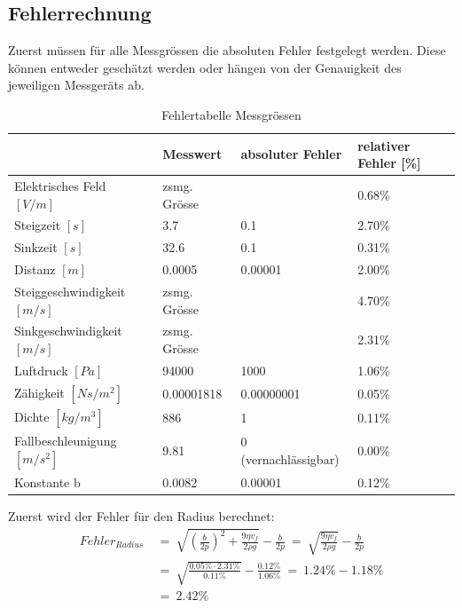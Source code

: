 \subsection{Fehlerrechnung}\label{sub:fehler}
Zuerst müssen für alle Messgrössen die absoluten Fehler festgelegt werden. Diese können entweder geschätzt werden oder hängen von der Genauigkeit des jeweiligen Messgeräts ab.

\begin{table}[h]
	\begin{center}
		\begin{tabular}{l|lll}
			                             & Messwert     & absoluter Fehler     & relativer Fehler [\%] \\ \toprule
			Elektrisches Feld $[V/m]$    & zsmg. Grösse &                      & 0.68\%                \\
			Steigzeit $[s]$              & 3.7          & 0.1                  & 2.70\%                \\
			Sinkzeit $[s]$               & 32.6         & 0.1                  & 0.31\%                \\
			Distanz $[m]$                & 0.0005       & 0.00001              & 2.00\%                \\
			Steiggeschwindigkeit $[m/s]$ & zsmg. Grösse &                      & 4.70\%                \\
			Sinkgeschwindigkeit $[m/s]$  & zsmg. Grösse &                      & 2.31\%                \\
			Luftdruck $[Pa]$             & 94000        & 1000                 & 1.06\%                \\
			Zähigkeit $[Ns/m^2]$         & 0.00001818   & 0.00000001           & 0.05\%                \\
			Dichte $[kg/m^3]$            & 886          & 1                    & 0.11\%                \\
			Fallbeschleunigung $[m/s^2]$ & 9.81         & 0 (vernachlässigbar) & 0.00\%                \\
			Konstante b                  & 0.0082       & 0.00001              & 0.12\%
		\end{tabular}
	\end{center}
	\caption{Fehlertabelle Messgrössen}
	\label{tab:messabsFehler}
\end{table}

\noindent Zuerst wird der Fehler für den Radius berechnet:
\begin{equation*}\label{eq:fehlerRadius}
	\begin{split}
		Fehler_{Radius} & \ = \ \sqrt{\left( \frac{b}{2p}\right)^2 + \frac{9\eta v_f}{2\rho g}} - \frac{b}{2p} \ = \ \sqrt{\frac{9\eta v_f}{2\rho g}} - \frac{b}{2p} \\
		                & \ = \ \sqrt{\frac{0.05\% \cdot 2.31\%}{0.11\%}} - \frac{0.12\%}{1.06\%} \ = \ 1.24\% - 1.18\%                                              \\
		                & \ = \ 2.42\%
	\end{split}
\end{equation*}

